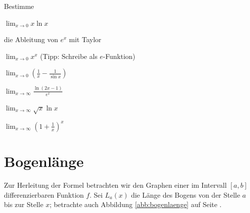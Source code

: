 \documentclass[%
draft,
11pt,%
twoside,%
titlepage,%
german,%
headsepline%
]{scrartcl}
\begin{document}
\begin{ueb}
Bestimme
\begin{enumeratea}
\item $\lim_{x\to0}x\ln x$
\item die Ableitung von $e^x$ mit Taylor
\item $\lim_{x\to0}x^x$ (Tipp: Schreibe als $e$-Funktion)
\item $\lim_{x\to0}\left(\frac{1}{x}-\frac{1}{\sin x}\right)$
\item $\lim_{x\to\infty}\frac{\ln(2x-1)}{e^x}$
\item $\lim_{x\to\infty}\sqrt{x}\ln x$
\item $\lim_{x\to\infty}\left(1+\frac{1}{x}\right)^x$
\end{enumeratea}
\end{ueb}

\section{Bogenl\"ange}

Zur Herleitung der Formel betrachten wir den Graphen einer im Intervall $[a,b]$ differenzierbaren Funktion $f$. Sei $L_a(x)$ die L\"ange des Bogens von der Stelle $a$ bis zur Stelle $x$; betrachte auch Abbildung \ref{abb:bogenlaenge} auf Seite \pageref{abb:bogenlaenge}.
\end{document}
